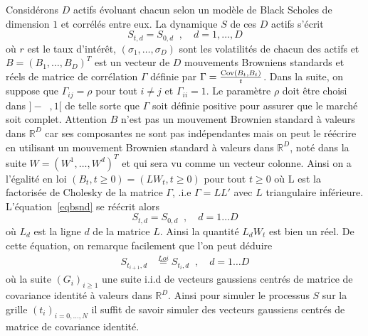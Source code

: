 \documentclass[a4paper,11pt]{article}
\def\R{{\mathbb R}}
\def\Cov{\mathop{\rm Cov}\nolimits}
\def\inv#1{\mathop{\frac{1}{ #1}}\nolimits}
\def\expp#1{\mathop {\mathrm{e}^{ #1}}}
\begin{document}
Considérons $D$ actifs évoluant chacun selon un modèle de Black Scholes de dimension $1$ et corrélés entre eux. La dynamique $S$ de ces $D$ actifs s'écrit
\begin{equation}
  \label{eqbsnd}
  S_{t,d} = S_{0,d} \expp{(r- {(\sigma_d)}^2/2) t + \sigma_d B_{t,d}}, \quad d=1,\dots, D
\end{equation}
où  $r$ est le taux d'intérêt, $(\sigma_1, \dots, \sigma_D)$ sont les volatilités de chacun des actifs et $B = (B_1, \dots, B_D)^T$ est un vecteur de $D$ mouvements Browniens standards et réels de matrice de corrélation $\Gamma$ définie par $\Gamma = \frac{\Cov(B_t, B_t)}{t}$. Dans la suite, on suppose que $\Gamma_{ij} = \rho$ pour tout $i \neq j$ et $\Gamma_{ii} = 1$. Le paramètre $\rho$ doit être choisi dans $]-\inv{D-1}, 1[$ de telle sorte que $\Gamma$ soit définie positive pour assurer que le marché soit complet.  Attention $B$ n'est pas un mouvement Brownien standard à valeurs dans $\R^D$ car ses composantes ne sont pas indépendantes mais on peut le réécrire en utilisant un mouvement Brownien standard à valeurs dans $\R^D$, noté dans la suite $W = (W^1, \dots, W^d)^T$ et qui sera vu comme un vecteur colonne. Ainsi on a l'égalité en loi $(B_t, t \ge 0) = (L W_t, t \ge 0)$ pour tout $t \ge 0$ où L est la factorisée de Cholesky de la matrice $\Gamma$, .i.e $\Gamma = LL'$ avec $L$ triangulaire inférieure.  L'équation~\eqref{eqbsnd} se réécrit alors
\begin{equation*}
  S_{t,d} = S_{0,d} \expp{(r- {(\sigma_d)}^2/2) t + \sigma_d L_d W_t}, \quad d=1\dots D
\end{equation*}
où $L_d$ est la ligne $d$ de la matrice $L$. Ainsi la quantité $L_d W_t$ est bien un réel.  De cette équation, on remarque facilement que l'on peut déduire
\begin{align*}
  S_{t_{i+1},d} & \stackrel{Loi}{=} S_{t_i,d} \expp{(r- {(\sigma_d)}^2/2)
  (t_{i+1} - t_i) + \sigma_d \sqrt{(t_{i+1} - t_i)}L_d G_{i+1}}, \quad d=1\dots D
\end{align*}
où la suite $(G_i)_{i \ge 1}$ une suite i.i.d de vecteurs gaussiens centrés de matrice de covariance identité à valeurs dans $\R^D$. Ainsi pour simuler le processus $S$ sur la grille $(t_i)_{i=0,\dots,N}$ il suffit de savoir simuler des vecteurs gaussiens centrés de matrice de covariance identité. \\
\end{document}
